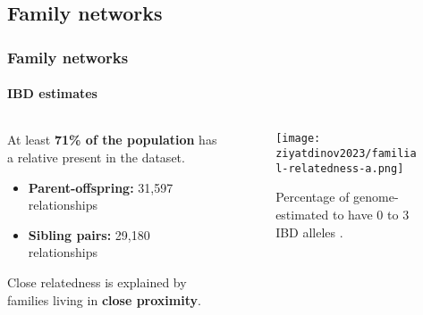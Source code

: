 \subsection{Family networks}
\begin{frame}
    \frametitle{Family networks}
    \framesubtitle{IBD estimates}

    \begin{columns}
        \begin{column}{0.5\textwidth}
            At least \textbf{\color{complement-2} 71\% of the population} has a relative present in the dataset.

            \begin{itemize}[label=$\bullet$,noitemsep,topsep=5pt]
                \item \textbf{Parent-offspring:} 31,597 relationships
                \item \textbf{Sibling pairs:} 29,180 relationships
            \end{itemize}

            Close relatedness is explained by families living in \textbf{close proximity}.
        \end{column}

        \begin{column}{0.5\textwidth}
            \begin{figure}[htpb]
                \centering
                \texttt{[image: ziyatdinov2023/familial-relatedness-a.png]}
                \caption{Percentage of genome-estimated to have 0 to 3 IBD alleles \parencite{ziyatdinov2023}.}
                \label{fig:percent-genome-ibd}
            \end{figure}
        \end{column}
    \end{columns}

\end{frame}


